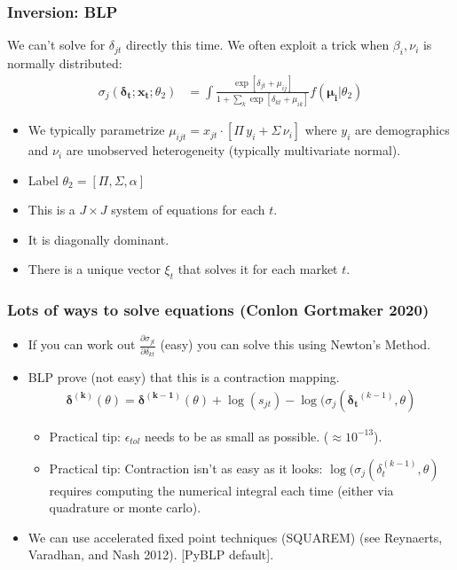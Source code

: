 \documentclass[aspectratio=169,10pt]{beamer}
\begin{document}
\begin{frame}
\frametitle{Inversion: BLP}
We can't solve for $\delta_{jt}$ directly this time. We often exploit a trick when $\beta_i,\nu_i$ is normally distributed:
\begin{align*}
\sigma_j(\symbf{\delta_t}; \symbf{x_t}; \theta_2) &= \int \frac{\exp[\delta_{jt} +  \mu_{ij} ]}{1+\sum_k \exp[\delta_{kt} + \mu_{ik} ]} f(\symbf{\mu_i}| \theta_2)
\end{align*}
 \begin{itemize}
    \item We typically parametrize $\mu_{ijt} = x_{jt} \cdot [\Pi \, y_i + \Sigma \, \nu_{i}]$ where $y_i$ are demographics and $\nu_i$ are unobserved heterogeneity (typically multivariate normal).
    \item Label $\theta_2 = [\Pi, \Sigma, \alpha]$
 \item This is a $J \times J$ system of equations for each $t$.
 \item It is diagonally dominant.
 \item There is a unique vector $\xi_t$ that solves it for each market $t$.
 \end{itemize}
\end{frame}

\begin{frame}
\frametitle{Lots of ways to solve equations (Conlon Gortmaker 2020)}
 \begin{itemize}
     \item If you can work out $\frac{\partial \sigma_{jt}}{\partial \delta_{kt}}$ (easy) you can solve this using Newton's Method. 
 \item BLP prove (not easy) that this is a \alert{contraction mapping}.
\begin{align*}
    \symbf{\delta^{(k)}}(\theta) = \symbf{\delta^{(k-1)}}(\theta) + \log(s_{jt}) - \log(\sigma_{j}(\symbf{\delta_t}^{(k-1)}, \theta)
\end{align*}

\begin{itemize} 
  \item Practical tip: $\epsilon_{tol}$ needs to be as small as possible. ($\approx 10^{-13}$).
 \item Practical tip: Contraction isn't as easy as it looks:  $ \log(\sigma_{j}(\delta_t^{(k-1)}, \theta)$ requires computing the numerical integral each time (either via quadrature or monte carlo).
\end{itemize}
\item We can use \alert{accelerated fixed point} techniques (SQUAREM) (see Reynaerts, Varadhan, and Nash 2012). [PyBLP default].
  \end{itemize}
 \end{frame}
\end{document}
